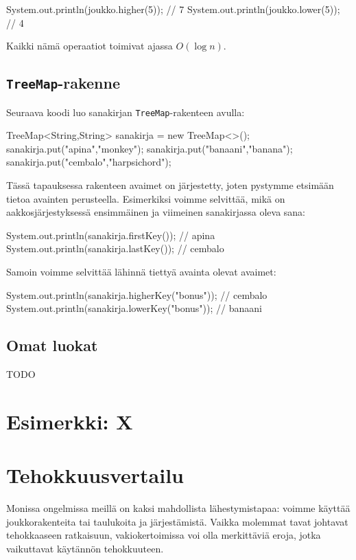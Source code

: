 \begin{code}
System.out.println(joukko.higher(5)); // 7
System.out.println(joukko.lower(5)); // 4
\end{code}

Kaikki nämä operaatiot toimivat ajassa $O(\log n)$.

\subsection{\texttt{TreeMap}-rakenne}

Seuraava koodi luo sanakirjan \texttt{TreeMap}-rakenteen avulla:

\begin{code}
TreeMap<String,String> sanakirja = new TreeMap<>();
sanakirja.put("apina","monkey");
sanakirja.put("banaani","banana");
sanakirja.put("cembalo","harpsichord");
\end{code}

Tässä tapauksessa rakenteen avaimet on järjestetty,
joten pystymme etsimään tietoa avainten perusteella.
Esimerkiksi voimme selvittää, mikä on aakkosjärjestyksessä
ensimmäinen ja viimeinen sanakirjassa oleva sana:

\begin{code}
System.out.println(sanakirja.firstKey()); // apina
System.out.println(sanakirja.lastKey()); // cembalo
\end{code}

Samoin voimme selvittää lähinnä tiettyä avainta olevat avaimet:

\begin{code}
System.out.println(sanakirja.higherKey("bonus")); // cembalo
System.out.println(sanakirja.lowerKey("bonus")); // banaani
\end{code}

\subsection{Omat luokat}

TODO

\section{Esimerkki: X}

\section{Tehokkuusvertailu}

Monissa ongelmissa meillä on kaksi mahdollista lähestymistapaa:
voimme käyttää joukkorakenteita tai taulukoita ja järjestämistä.
Vaikka molemmat tavat johtavat tehokkaaseen ratkaisuun,
vakiokertoimissa voi olla merkittäviä eroja, jotka vaikuttavat
käytännön tehokkuuteen.

